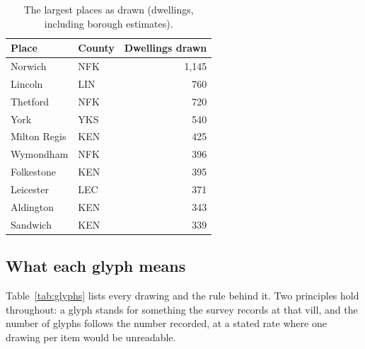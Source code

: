 \documentclass[11pt,a4paper]{article}
\begin{document}
\begin{table}[H]\centering\small
\caption{The largest places as drawn (dwellings, including borough estimates).}\label{tab:towns}
\begin{tabular}{llr}\toprule Place & County & Dwellings drawn \\ \midrule
Norwich & NFK & 1,145 \\
Lincoln & LIN & 760 \\
Thetford & NFK & 720 \\
York & YKS & 540 \\
Milton Regis & KEN & 425 \\
Wymondham & NFK & 396 \\
Folkestone & KEN & 395 \\
Leicester & LEC & 371 \\
Aldington & KEN & 343 \\
Sandwich & KEN & 339 \\
\bottomrule\end{tabular}\end{table}

\subsection{What each glyph means}
Table~\ref{tab:glyphs} lists every drawing and the rule behind it. Two principles hold throughout: a glyph stands for something the survey records at that vill, and the number of glyphs follows the number recorded, at a stated rate where one drawing per item would be unreadable.
\end{document}
